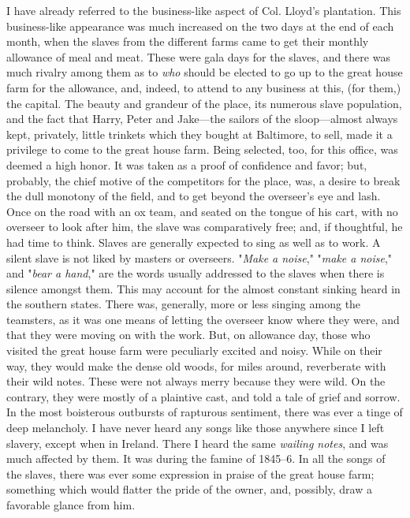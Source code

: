 I have already referred to the business-like aspect of Col. Lloyd's
plantation. This business-like appearance was much increased on the two
days at the end {}of each month, when the slaves from the different
farms came to get their monthly allowance of meal and meat. These were
gala days for the slaves, and there was much rivalry among them as to
\emph{who} should be elected to go up to the great house farm for the
allowance, and, indeed, to attend to any business at this, (for them,)
the capital. The beauty and grandeur of the place, its numerous slave
population, and the fact that Harry, Peter and Jake---the sailors of the
sloop---almost always kept, privately, little trinkets which they bought
at Baltimore, to sell, made it a privilege to come to the great house
farm. Being selected, too, for this office, was deemed a high honor. It
was taken as a proof of confidence and favor; but, probably, the chief
motive of the competitors for the place, was, a desire to break the dull
monotony of the field, and to get beyond the overseer's eye and lash.
Once on the road with an ox team, and seated on the tongue of his cart,
with no overseer to look after him, the slave was comparatively free;
and, if thoughtful, he had time to think. Slaves are generally expected
to sing as well as to work. A silent slave is not liked by masters or
overseers. "\emph{Make a noise}," "\emph{make a noise}," and "\emph{bear
a hand}," are the words usually addressed to the slaves when there is
silence amongst them. This may account for the almost constant sinking
heard in the southern states. There was, generally, more or less singing
among the teamsters, as it was one means of letting the overseer know
where they were, and that they were moving on with the work. But, on
allowance day, those who visited the great house farm were peculiarly
excited {}and noisy. While on their way, they would make the dense old
woods, for miles around, reverberate with their wild notes. These were
not always merry because they were wild. On the contrary, they were
mostly of a plaintive cast, and told a tale of grief and sorrow. In the
most boisterous outbursts of rapturous sentiment, there was ever a tinge
of deep melancholy. I have never heard any songs like those anywhere
since I left slavery, except when in Ireland. There I heard the same
\emph{wailing notes}, and was much affected by them. It was during the
famine of 1845--6. In all the songs of the slaves, there was ever some
expression in praise of the great house farm; something which would
flatter the pride of the owner, and, possibly, draw a favorable glance
from him.

